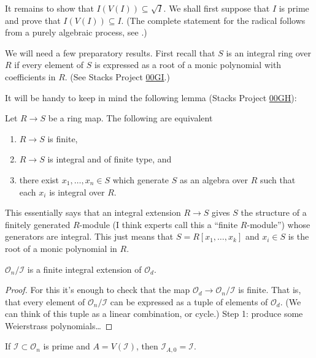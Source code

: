 It remains to show that $I(V(I)) \subseteq
\sqrt{I}$.
We shall first suppose that  $I$ is prime
and prove that $I(V(I)) \subseteq I$.
(The complete statement for the radical
follows
from a purely algebraic process,
see \cite[Theorem 4.22]{Demailly}.)

We will need a few preparatory results.
First recall that $S$ is an integral ring
over $R$
if every element of $S$ is expressed as
a root of a monic polynomial with
coefficients in $R$.
(See Stacks Project
\href{https://stacks.math.columbia.edu/tag/%
00GI}{00GI}.)

It will be handy to keep in mind the
following lemma
(Stacks Project
\href{https://stacks.math.columbia.edu/tag/%
00GH}{00GH}):

\begin{lemma}
\label{lemma-chara-finit-terms-integ}
Let $R \to S$ be a ring map. The following
are equivalent
\begin{enumerate}
\item $R \to S$ is finite,
\item $R \to S$ is integral and of finite
type, and
\item there exist $x_1, \ldots, x_n \in S$
which generate $S$ as an
algebra over $R$ such that each $x_i$ is
integral over $R$.
\end{enumerate}
\end{lemma}

\noindent
This essentially says that an integral
extension
$R \to S$ gives $S$ the structure of a
finitely generated $R$-module
(I think experts call this a ``finite
$R$-module'')
whose generators are integral.
This just means that $S=R[x_1,\ldots,x_k]$
and $x_i \in S$ is the root of a monic
polynomial in $R$.

\begin{proposition}
\label{proposition-integral-extension}
$\mathcal{O}_n/\mathcal{I}$ is a
finite integral extension of $\mathcal{O}_d$.
\end{proposition}

\begin{proof}
For this it's enough to check that
the map $\mathcal{O}_d \to
\mathcal{O}_n/\mathcal{I}$
is finite.
That is, that every element of
$\mathcal{O}_n/\mathcal{I}$
can be expressed as a tuple of elements
of $\mathcal{O}_d$.
(We can think of this tuple
as a linear combination, or cycle.)
Step 1: produce some Weierstrass
polynomials…
\end{proof}

\begin{lemma}
\label{lemma-nullstellensatz}
\begin{reference}
\cite[Lemma 4.21]{Demailly}
\end{reference}
If $\mathcal{I} \subset \mathcal{O}_n$ is
prime and
$A = V(\mathcal{I})$, then
$\mathcal{I}_{A,0}=\mathcal{I}$.
\end{lemma}

